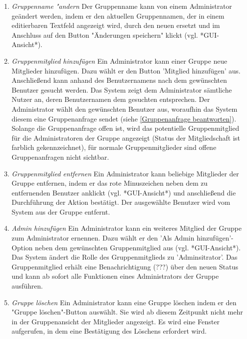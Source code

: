 \documentclass[parskip=full]{scrartcl}
\def\threedigits#1{%
  \ifnum#1<100 0\fi
  \ifnum#1<10 0\fi
  \number#1}
\begin{document}
\begin{enumerate}[label={\textbf{/F\protect\threedigits{\theenumi}0/}}, leftmargin=*, resume]

	\item \textit{Gruppenname "andern}
	Der Gruppenname kann von einem Administrator geändert werden, indem er den aktuellen Gruppennamen, der in einem editierbaren Textfeld angezeigt wird, durch den neuen ersetzt und im Anschluss auf den Button "Änderungen speichern" klickt (vgl. *GUI-Ansicht*).
	
	\item \textit{Gruppenmitglied hinzufügen} \label{Mitglieder hinzufügen}
	Ein Administrator kann einer Gruppe neue Mitglieder hinzufügen. Dazu wählt er den Button 'Mitglied hinzufügen' aus. Anschließend kann anhand des \gls{Benutzername}ns nach dem gewünschten Benutzer gesucht werden. Das System zeigt dem Administrator sämtliche Nutzer an, deren Benutzernamen dem gesuchten entsprechen. Der Administrator wählt den gewünschten Benutzer aus, woraufhin das System diesem eine Gruppenanfrage sendet (siehe \ref{Gruppenanfrage beantworten}). Solange die Gruppenanfrage offen ist, wird das potentielle Gruppenmitglied für die Administratoren der Gruppe angezeigt (Status der Mitgliedschaft ist farblich gekennzeichnet), für normale Gruppenmitglieder sind offene Gruppenanfragen nicht sichtbar.
	
	\item \textit{Gruppenmitglied entfernen}
	Ein Administrator kann beliebige Mitglieder der Gruppe entfernen, indem er das rote Minuszeichen neben dem zu entfernenden Benutzer anklickt (vgl. *GUI-Ansicht*) und anschließend die Durchführung der Aktion bestätigt. Der ausgewählte Benutzer wird vom System aus der Gruppe entfernt.
	
	\item \textit{Admin hinzufügen} \label{Admin hinzufügen}
	Ein Administrator kann ein weiteres Mitglied der Gruppe zum Administrator ernennen. Dazu wählt er den 'Als Admin hinzufügen'-Option neben dem gewünschten Gruppenmitglied aus (vgl. *GUI-Ansicht*). Das System ändert die Rolle des Gruppenmitglieds zu 'Adminsitrator'. Das Gruppenmitglied erhält eine Benachrichtigung (???) über den neuen Status und kann ab sofort alle Funktionen eines Administrators der Gruppe ausführen.
	
	\item \textit{Gruppe löschen}
	Ein Administrator kann eine Gruppe löschen indem er den "Gruppe löschen"-Button auswählt. Sie wird ab diesem Zeitpunkt nicht mehr in der Gruppenansicht der Mitglieder angezeigt. Es wird eine Fenster aufgerufen, in dem eine Bestätigung des Löschens erfordert wird.
	
	
\end{enumerate}
	
\end{document}
